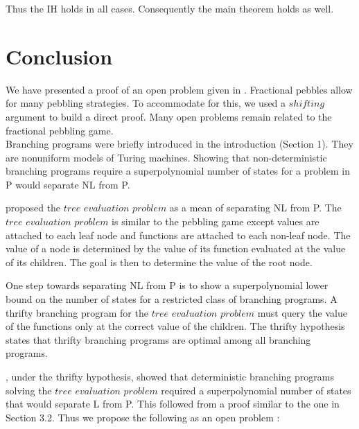 \documentclass[12pt]{article}
\begin{document}
Thus the IH holds in all cases. Consequently the main theorem holds as well.






\newpage 
\section{Conclusion} 

We have presented a proof of an open problem given in \cite{c:pebjournal}. Fractional pebbles allow for many pebbling strategies. To accommodate for this, we used a $shifting$ argument to build a direct proof. Many open problems remain related to the fractional pebbling game.\\

Branching programs were briefly introduced in the introduction (Section 1). They are nonuniform models of Turing machines. Showing that non-deterministic branching programs require a superpolynomial number of states for a problem in P would separate NL from P. 

\cite{c:pebjournal} proposed the $tree$ $evaluation$ $problem$ as a mean of separating NL from P. The $tree$ $evaluation$ $problem$ is similar to the pebbling game except values are attached to each leaf node and functions are attached to each non-leaf node. The value of a node is determined by the value of its function evaluated at the value of its children. The goal is then to determine the value of the root node. 

One step towards separating NL from P is to show a superpolynomial lower bound on the number of states for a restricted class of branching programs. A thrifty branching program for the $tree$ $evaluation$ $problem$ must query the value of the functions only at the correct value of the children. The thrifty hypothesis states that thrifty branching programs are optimal among all branching programs.

\cite{c:pebjournal}, under the thrifty hypothesis, showed that deterministic branching programs solving the $tree$ $evaluation$ $problem$ required a superpolynomial number of states that would separate L from P. This followed from a proof similar to the one in Section 3.2. Thus we propose the following as an open problem :

\end{document}
